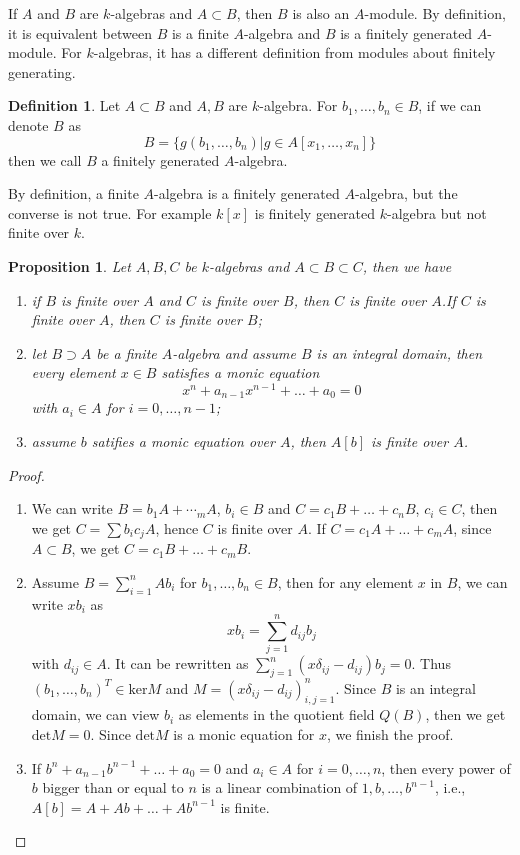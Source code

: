 \documentclass{amsart}
\theoremstyle{plain}
\newtheorem{proposition}{Proposition}
\theoremstyle{definition}
\newtheorem{definition}{Definition}
\theoremstyle{remark}
\numberwithin{equation}{section}
\begin{document}
 If $ A $ and $ B $ are $ k $-algebras and $ A\subset B $, then $ B $ is also an $ A $-module. By definition, it is equivalent between $ B $ is a finite $ A $-algebra and $ B $ is a finitely generated $ A $-module. For $ k $-algebras, it has a different definition from modules about finitely generating. 
 \begin{definition}
 	Let $ A\subset B $ and $ A,B $ are $ k $-algebra. For $ b_1,\dots,b_n\in B $, if we can denote $ B $ as 
 	$$
 	B=\lbrace g(b_1,\dots,b_n)|g\in A[x_1,\dots,x_n] \rbrace
 	$$
 	then we call $ B $ a finitely generated $ A $-algebra.
 \end{definition} 
 By definition, a finite $ A $-algebra is a finitely generated $ A $-algebra, but the converse is not true. For example $ k[x] $ is finitely generated $ k $-algebra but not finite over $ k $.
 \begin{proposition}
 	Let $ A,B,C $ be $ k $-algebras and $ A\subset B\subset C $, then we have
 	\begin{enumerate}
 		\item if $ B $ is finite over $ A $ and $ C $ is finite over $ B $, then $ C $ is finite over $ A $.If $ C $ is finite over $ A $, then $ C $ is finite over $ B $;
 		\item let $ B\supset A $ be a finite $ A $-algebra and assume $ B $ is an integral domain, then every element  $ x\in B $ satisfies a monic equation
 		$$
 		x^n+a_{n-1}x^{n-1}+\dots+a_0=0
 		$$
 		with $ a_i\in A $ for $ i=0,\dots,n-1 $;
 		\item assume $ b $ satifies a monic equation over $ A $, then $ A[b] $ is finite over $ A $.
 	\end{enumerate}
 \end{proposition}
 \begin{proof}
 	\begin{enumerate}
 		\item  We can write $ B=b_1A+\dotsb_mA $, $ b_i\in B $ and $ C=c_1B+\dots+c_nB $, $ c_i\in C $, then we get $ C=\sum b_ic_j A $, hence $ C $ is finite over $ A $. If $ C=c_1A+\dots+c_mA $, since $ A\subset B $, we get $ C=c_1B+\dots+c_mB $.
 		\item Assume $ B=\sum\limits_{i=1}^{n}Ab_i $ for $ b_1,\dots,b_n\in B $, then for any element $ x $ in $ B $, we can write $ xb_i $ as 
 		$$
 		xb_i=\sum\limits_{j=1}^{n}d_{ij}b_j
 		$$
 		with $ d_{ij}\in A $. It can be rewritten as
 		$ \sum\limits_{j=1}^{n}(x\delta_{ij}-d_{ij})b_j=0 $. Thus $ (b_1,\dots,b_n)^{T}\in \text{ker}M $ and $ M=(x\delta_{ij}-d_{ij})_{i,j=1}^{n} $. Since $ B $ is an integral domain, we can view $ b_i $ as elements in the quotient field $ Q(B) $, then we get $ \text{det}M=0 $. Since $ \text{det}M $ is a monic equation for $ x $, we finish the proof.
 		\item If $ b^n+a_{n-1}b^{n-1}+\dots+a_0=0 $ and $ a_i\in A $ for $ i=0,\dots,n $, then every power of $ b $ bigger than  or equal to $ n $ is a linear combination of $ 1,b,\dots,b^{n-1} $, i.e., $ A[b]=A+Ab+\dots +Ab^{n-1} $ is finite. 
 	\end{enumerate}
 \end{proof}
\end{document}
